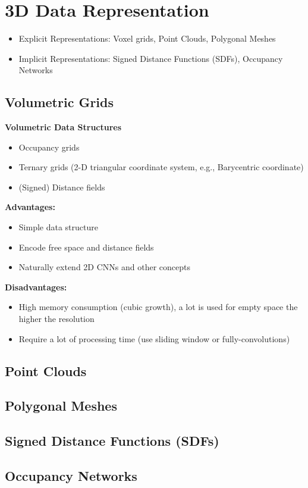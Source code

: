 \section{3D Data Representation}

\begin{itemize}
    \item Explicit Representations: Voxel grids, Point Clouds, Polygonal Meshes
    \item Implicit Representations: Signed Distance Functions (SDFs), Occupancy Networks
\end{itemize}


\subsection{Volumetric Grids}

\textbf{Volumetric Data Structures}
\begin{itemize}
    \item Occupancy grids
    \item Ternary grids (2-D triangular coordinate system, e.g., Barycentric coordinate)
    \item (Signed) Distance fields
\end{itemize}

\textbf{Advantages:}
\begin{itemize}
    \item Simple data structure
    \item Encode free space and distance fields
    \item Naturally extend 2D CNNs and other concepts
\end{itemize}

\textbf{Disadvantages:}
\begin{itemize}
    \item High memory consumption (cubic growth), a lot is used for empty space the higher the resolution
    \item Require a lot of processing time (use sliding window or fully-convolutions)
\end{itemize}

\subsection{Point Clouds}

\subsection{Polygonal Meshes}



\subsection{Signed Distance Functions (SDFs)}

\subsection{Occupancy Networks}